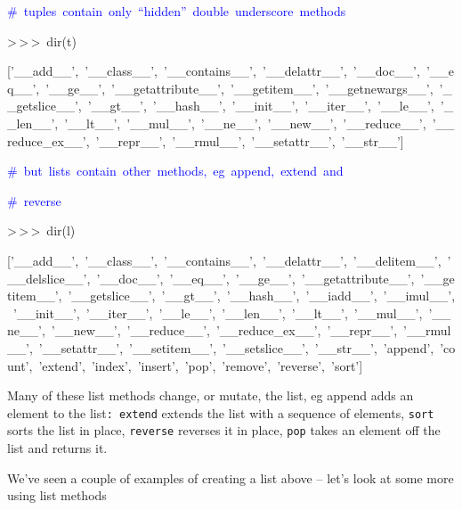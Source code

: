 \begin{lyxcode}
\textcolor{blue}{\#~tuples~contain~only~{}``hidden''~double~underscore~methods}

>\,{}>\,{}>~dir(t)

{[}'\_\_add\_\_',~'\_\_class\_\_',~'\_\_contains\_\_',~'\_\_delattr\_\_',~'\_\_doc\_\_',~'\_\_eq\_\_',~'\_\_ge\_\_',~'\_\_getattribute\_\_',~'\_\_getitem\_\_',~'\_\_getnewargs\_\_',~'\_\_getslice\_\_',~'\_\_gt\_\_',~'\_\_hash\_\_',~'\_\_init\_\_',~'\_\_iter\_\_',~'\_\_le\_\_',~'\_\_len\_\_',~'\_\_lt\_\_',~'\_\_mul\_\_',~'\_\_ne\_\_',~'\_\_new\_\_',~'\_\_reduce\_\_',~'\_\_reduce\_ex\_\_',~'\_\_repr\_\_',~'\_\_rmul\_\_',~'\_\_setattr\_\_',~'\_\_str\_\_']



\textcolor{blue}{\#~but~lists~contain~other~methods,~eg~append,~extend~and}

\textcolor{blue}{\#~reverse}

>\,{}>\,{}>~dir(l)

{[}'\_\_add\_\_',~'\_\_class\_\_',~'\_\_contains\_\_',~'\_\_delattr\_\_',~'\_\_delitem\_\_',~'\_\_delslice\_\_',~'\_\_doc\_\_',~'\_\_eq\_\_',~'\_\_ge\_\_',~'\_\_getattribute\_\_',~'\_\_getitem\_\_',~'\_\_getslice\_\_',~'\_\_gt\_\_',~'\_\_hash\_\_',~'\_\_iadd\_\_',~'\_\_imul\_\_',~'\_\_init\_\_',~'\_\_iter\_\_',~'\_\_le\_\_',~'\_\_len\_\_',~'\_\_lt\_\_',~'\_\_mul\_\_',~'\_\_ne\_\_',~'\_\_new\_\_',~'\_\_reduce\_\_',~'\_\_reduce\_ex\_\_',~'\_\_repr\_\_',~'\_\_rmul\_\_',~'\_\_setattr\_\_',~'\_\_setitem\_\_',~'\_\_setslice\_\_',~'\_\_str\_\_',~'append',~'count',~'extend',~'index',~'insert',~'pop',~'remove',~'reverse',~'sort']
\end{lyxcode}
Many of these list methods change, or mutate, the list, eg append
adds an element to the list\texttt{: extend} extends the list with
a sequence of elements, \texttt{sort} sorts the list in place, \texttt{reverse}
reverses it in place, \texttt{pop} takes an element off the list and
returns it.

We've seen a couple of examples of creating a list above -- let's
look at some more using list methods

